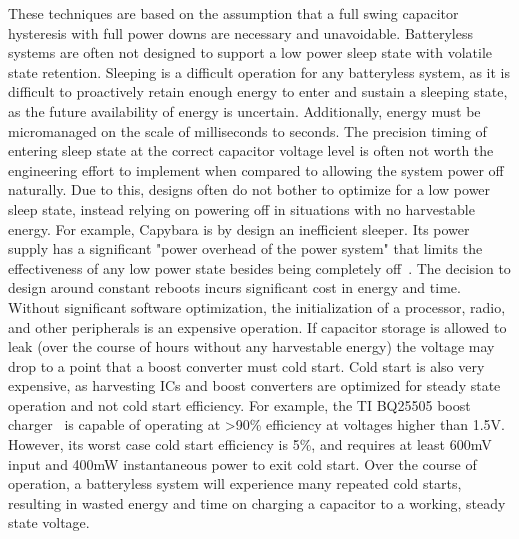 These techniques are based on the assumption that a full swing capacitor hysteresis with full power downs are necessary and unavoidable. Batteryless systems are often not designed to support a low power sleep state with volatile state retention.
Sleeping is a difficult operation for any batteryless system, as it is difficult to proactively retain enough energy to enter and sustain a sleeping state, as the future availability of energy is uncertain.
Additionally, energy must be micromanaged on the scale of milliseconds to seconds.
The precision timing of entering sleep state at the correct capacitor voltage level is often not worth the engineering effort to implement when compared to allowing the system power off naturally.
Due to this, designs often do not bother to optimize for a low power sleep state, instead relying on powering off in situations with no harvestable energy.
For example, Capybara is by design an inefficient sleeper. Its power supply has a significant
"power overhead of the power system" that limits the effectiveness of
any low power state besides being completely off~\cite{colinReconfigurable18}.
The decision to design around constant reboots incurs significant cost in energy and time. Without significant software optimization, the initialization of a processor, radio, and other peripherals is an expensive operation. If capacitor storage is allowed to leak (over the course of hours without any harvestable energy) the voltage may drop to a point that a boost converter must cold start.
Cold start is also very expensive, as harvesting ICs and boost converters are optimized for steady state operation and not cold start efficiency.
For example, the TI BQ25505 boost charger~\cite{bq25505} is capable of operating at \textgreater90\% efficiency at voltages higher than 1.5\si{\volt}.
However, its worst case cold start efficiency is 5\%, and requires at least 600\si{\milli\volt} input and 400\si{\milli\watt} instantaneous power to exit cold start.
Over the course of operation, a batteryless system will experience many repeated cold starts, resulting in wasted energy and time on charging a capacitor to a working, steady state voltage.

